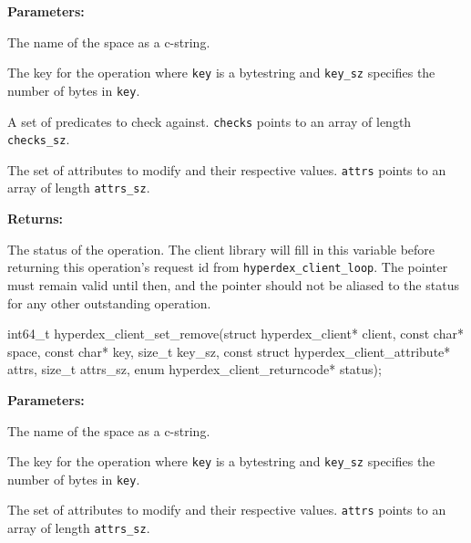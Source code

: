 \noindent\textbf{Parameters:}
\begin{description}[labelindent=\widthof{{\texttt{checks}, \texttt{checks\_sz}}},leftmargin=*,noitemsep,nolistsep,align=right]
\item[\texttt{space}] The name of the space as a c-string.
\item[\texttt{key}, \texttt{key\_sz}] The key for the operation where \texttt{key} is a bytestring and \texttt{key\_sz} specifies the number of bytes in \texttt{key}.
\item[\texttt{checks}, \texttt{checks\_sz}] A set of predicates to check against.  \texttt{checks} points to an array of length \texttt{checks\_sz}.
\item[\texttt{attrs}, \texttt{attrs\_sz}] The set of attributes to modify and their respective values.  \texttt{attrs} points to an array of length \texttt{attrs\_sz}.
\end{description}

\noindent\textbf{Returns:}
\begin{description}[labelindent=\widthof{{\texttt{status}}},leftmargin=*,noitemsep,nolistsep,align=right]
\item[\texttt{status}] The status of the operation.  The client library will fill in this variable before returning this operation's request id from \texttt{hyperdex\_client\_loop}.  The pointer must remain valid until then, and the pointer should not be aliased to the status for any other outstanding operation.
\end{description}

\funcsep
{}
\begin{ccode}
int64_t hyperdex_client_set_remove(struct hyperdex_client* client,
                const char* space,
                const char* key, size_t key_sz,
                const struct hyperdex_client_attribute* attrs, size_t attrs_sz,
                enum hyperdex_client_returncode* status);
\end{ccode}
\funcdesc 

\noindent\textbf{Parameters:}
\begin{description}[labelindent=\widthof{{\texttt{attrs}, \texttt{attrs\_sz}}},leftmargin=*,noitemsep,nolistsep,align=right]
\item[\texttt{space}] The name of the space as a c-string.
\item[\texttt{key}, \texttt{key\_sz}] The key for the operation where \texttt{key} is a bytestring and \texttt{key\_sz} specifies the number of bytes in \texttt{key}.
\item[\texttt{attrs}, \texttt{attrs\_sz}] The set of attributes to modify and their respective values.  \texttt{attrs} points to an array of length \texttt{attrs\_sz}.
\end{description}

